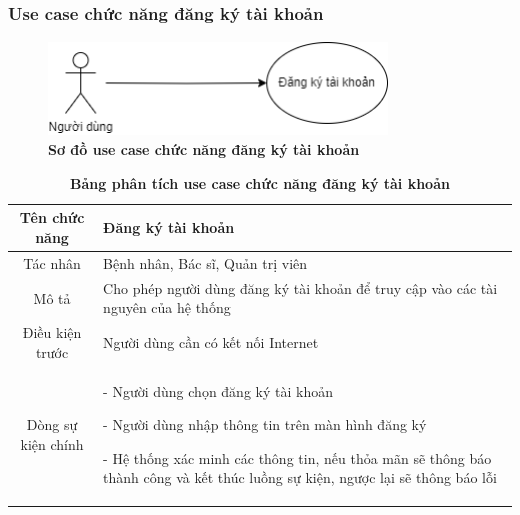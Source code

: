 \subsubsection{Use case chức năng đăng ký tài khoản}
  \begin{figure}[H]
    \centering
    \includegraphics[width=9cm,height=2.5cm]{Images/use_case/use_case_register.png}
    \caption[Sơ đồ use case chức năng đăng ký tài khoản]{\bfseries \fontsize{12pt}{0pt}
    \selectfont Sơ đồ use case chức năng đăng ký tài khoản}
    \label{use_case_register} %
  \end{figure}

  \begin{table}[H]
    \caption{\bfseries \fontsize{12pt}{0pt}\selectfont Bảng phân tích use case chức năng đăng ký tài khoản}
    \centering
    \begin{tabularx}{0.9\textwidth}{|c|X|}
      \hline
      \textbf{Tên chức năng} & \textbf{Đăng ký tài khoản} \\
      \hline
      Tác nhân & Bệnh nhân, Bác sĩ, Quản trị viên \\
      \hline
      Mô tả & Cho phép người dùng đăng ký tài khoản để truy cập vào các tài nguyên của hệ thống 
       \\
      \hline
      Điều kiện trước & Người dùng cần có kết nối Internet \\
      \hline
      Dòng sự kiện chính & 
        - Người dùng chọn đăng ký tài khoản

        - Người dùng nhập thông tin trên màn hình đăng ký

        - Hệ thống xác minh các thông tin, nếu thỏa mãn sẽ thông báo thành công và kết thúc luồng sự kiện, ngược lại 
        sẽ thông báo lỗi 
        \\
      \hline
    \end{tabularx}
  \end{table}

